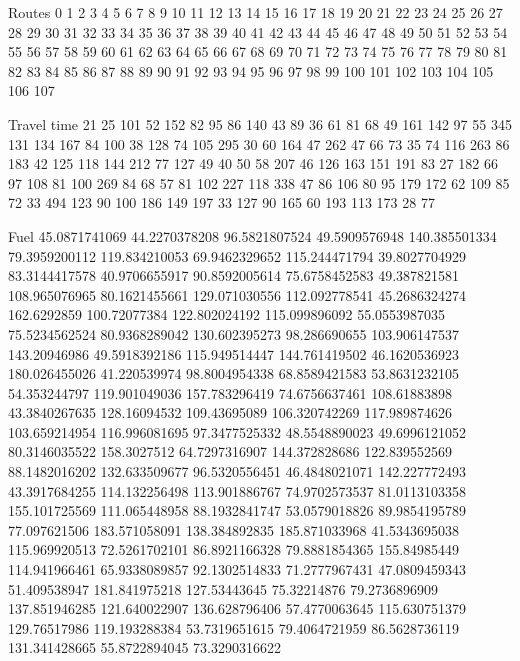 Routes	0	1	2	3	4	5	6	7	8	9	10	11	12	13	14	15	16	17	18	19	20	21	22	23	24	25	26	27	28	29	30	31	32	33	34	35	36	37	38	39	40	41	42	43	44	45	46	47	48	49	50	51	52	53	54	55	56	57	58	59	60	61	62	63	64	65	66	67	68	69	70	71	72	73	74	75	76	77	78	79	80	81	82	83	84	85	86	87	88	89	90	91	92	93	94	95	96	97	98	99	100	101	102	103	104	105	106	107	

Travel time	21	25	101	52	152	82	95	86	140	43	89	36	61	81	68	49	161	142	97	55	345	131	134	167	84	100	38	128	74	105	295	30	60	164	47	262	47	66	73	35	74	116	263	86	183	42	125	118	144	212	77	127	49	40	50	58	207	46	126	163	151	191	83	27	182	66	97	108	81	100	269	84	68	57	81	102	227	118	338	47	86	106	80	95	179	172	62	109	85	72	33	494	123	90	100	186	149	197	33	127	90	165	60	193	113	173	28	77	

Fuel	45.0871741069	44.2270378208	96.5821807524	49.5909576948	140.385501334	79.3959200112	119.834210053	69.9462329652	115.244471794	39.8027704929	83.3144417578	40.9706655917	90.8592005614	75.6758452583	49.387821581	108.965076965	80.1621455661	129.071030556	112.092778541	45.2686324274	162.6292859	100.72077384	122.802024192	115.099896092	55.0553987035	75.5234562524	80.9368289042	130.602395273	98.286690655	103.906147537	143.20946986	49.5918392186	115.949514447	144.761419502	46.1620536923	180.026455026	41.220539974	98.8004954338	68.8589421583	53.8631232105	54.353244797	119.901049036	157.783296419	74.6756637461	108.61883898	43.3840267635	128.16094532	109.43695089	106.320742269	117.989874626	103.659214954	116.996081695	97.3477525332	48.5548890023	49.6996121052	80.3146035522	158.3027512	64.7297316907	144.372828686	122.839552569	88.1482016202	132.633509677	96.5320556451	46.4848021071	142.227772493	43.3917684255	114.132256498	113.901886767	74.9702573537	81.0113103358	155.101725569	111.065448958	88.1932841747	53.0579018826	89.9854195789	77.097621506	183.571058091	138.384892835	185.871033968	41.5343695038	115.969920513	72.5261702101	86.8921166328	79.8881854365	155.84985449	114.941966461	65.9338089857	92.1302514833	71.2777967431	47.0809459343	51.409538947	181.841975218	127.53443645	75.32214876	79.2736896909	137.851946285	121.640022907	136.628796406	57.4770063645	115.630751379	129.76517986	119.193288384	53.7319651615	79.4064721959	86.5628736119	131.341428665	55.8722894045	73.3290316622	
